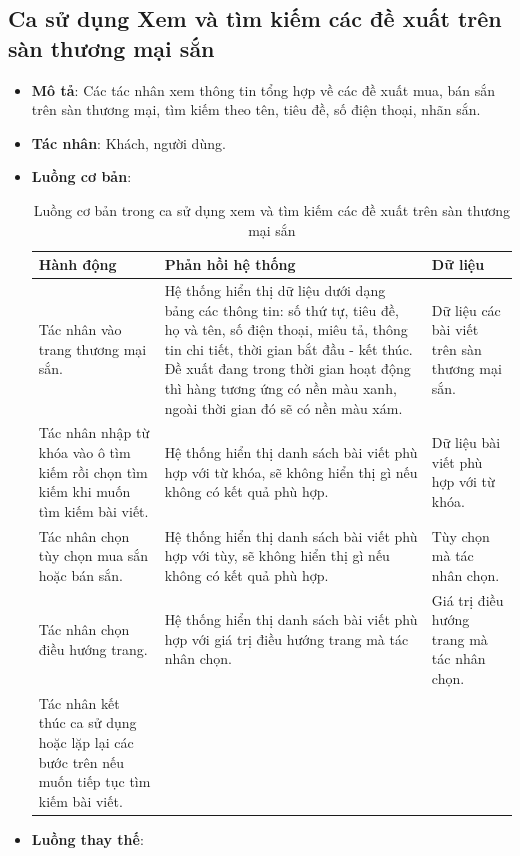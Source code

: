 \documentclass[./../main.tex]{subfiles}
\begin{document}
\subsection{Ca sử dụng Xem và tìm kiếm các đề xuất trên sàn thương mại sắn}
\begin{itemize}
    \item \textbf{Mô tả}: Các tác nhân xem thông tin tổng hợp về các đề xuất mua, bán sắn trên sàn thương mại, tìm kiếm theo tên, tiêu đề, số điện thoại, nhãn sắn.
    \item \textbf{Tác nhân}: Khách, người dùng.
    \item \textbf{Luồng cơ bản}:
    \begin{table}[H]
    \caption{\label{uc-30}Luồng cơ bản trong ca sử dụng xem và tìm kiếm các đề xuất trên sàn thương mại sắn}
    \begin{tabularx}{\textwidth}{| X | X | X |}
        \hline
        \textbf{Hành động} & \textbf{Phản hồi hệ thống} & \textbf{Dữ liệu} \\ \hline
        Tác nhân vào trang thương mại sắn. &  Hệ thống hiển thị dữ liệu dưới dạng bảng các thông tin: số thứ tự, tiêu đề, họ và tên, số điện thoại, miêu tả, thông tin chi tiết, thời gian bắt đầu - kết thúc. Đề xuất đang trong thời gian hoạt động thì hàng tương ứng có nền màu xanh, ngoài thời gian đó sẽ có nền màu xám. & Dữ liệu các bài viết trên sàn thương mại sắn.
        \\ \hline
        Tác nhân nhập từ khóa vào ô tìm kiếm rồi chọn tìm kiếm khi muốn tìm kiếm bài viết. & Hệ thống hiển thị danh sách bài viết phù hợp với từ khóa, sẽ không hiển thị gì nếu không có kết quả phù hợp. & Dữ liệu bài viết phù hợp với từ khóa.
        \\ \hline
        Tác nhân chọn tùy chọn mua sắn hoặc bán sắn. & Hệ thống hiển thị danh sách bài viết phù hợp với tùy, sẽ không hiển thị gì nếu không có kết quả phù hợp. & Tùy chọn mà tác nhân chọn.
        \\ \hline
        Tác nhân chọn điều hướng trang. & Hệ thống hiển thị danh sách bài viết phù hợp với giá trị điều hướng trang mà tác nhân chọn. & Giá trị điều hướng trang mà tác nhân chọn.
        \\ \hline
        Tác nhân kết thúc ca sử dụng hoặc lặp lại các bước trên nếu muốn tiếp tục tìm kiếm bài viết. & &
        \\ \hline
    \end{tabularx}
    \end{table}    
    \item \textbf{Luồng thay thế}:

\end{itemize}
\end{document}
